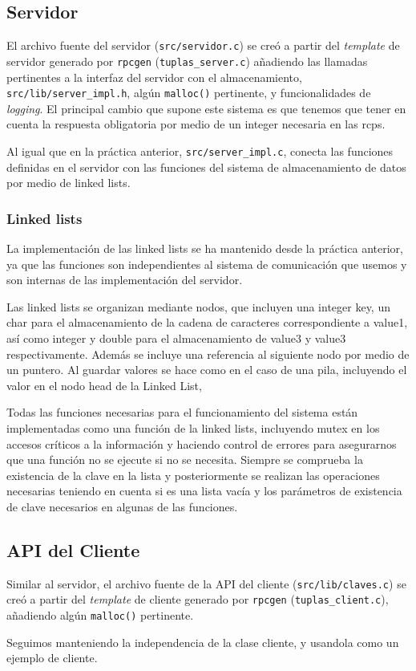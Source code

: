 \subsection{Servidor}
El archivo fuente del servidor (\texttt{src/servidor.c}) se creó a partir del \textit{template} de servidor generado por \texttt{rpcgen} (\texttt{tuplas\_server.c}) añadiendo las llamadas pertinentes a la interfaz del servidor con el almacenamiento, \texttt{src/lib/server\_impl.h}, algún \texttt{malloc()} pertinente, y funcionalidades de \textit{logging}. El principal cambio que supone este sistema es que tenemos que tener en cuenta la respuesta obligatoria por medio de un integer necesaria en las rcps.

Al igual que en la práctica anterior, \texttt{src/server\_impl.c}, conecta las funciones definidas en el servidor con las funciones del sistema de almacenamiento de datos por medio de linked lists. 

\subsubsection{Linked lists}

La implementación de las linked lists se ha mantenido desde la práctica anterior, ya que las funciones son independientes al sistema de comunicación que usemos y son internas de las implementación del servidor.

Las linked lists se organizan mediante nodos, que incluyen una integer key, un char para el almacenamiento de la cadena de caracteres correspondiente a value1, así como integer y double para el almacenamiento de value3 y value3 respectivamente. Además se incluye una referencia al siguiente nodo por medio de un puntero. Al guardar valores se hace como en el caso de una pila, incluyendo el valor en el nodo head de la Linked List,

Todas las funciones necesarias para el funcionamiento del sistema están implementadas como una función de la linked lists, incluyendo mutex en los accesos críticos a la información y haciendo control de errores para asegurarnos que una función no se ejecute si no se necesita. Siempre se comprueba la existencia de la clave en la lista y posteriormente se realizan las operaciones necesarias teniendo en cuenta si es una lista vacía y los parámetros de existencia de clave necesarios en algunas de las funciones.

\subsection{API del Cliente}
Similar al servidor, el archivo fuente de la API del cliente (\texttt{src/lib/claves.c}) se creó a partir del \textit{template} de cliente generado por \texttt{rpcgen} (\texttt{tuplas\_client.c}), añadiendo  algún \texttt{malloc()} pertinente.\newline

Seguimos manteniendo la independencia de la clase cliente, y usandola como un ejemplo de cliente.
